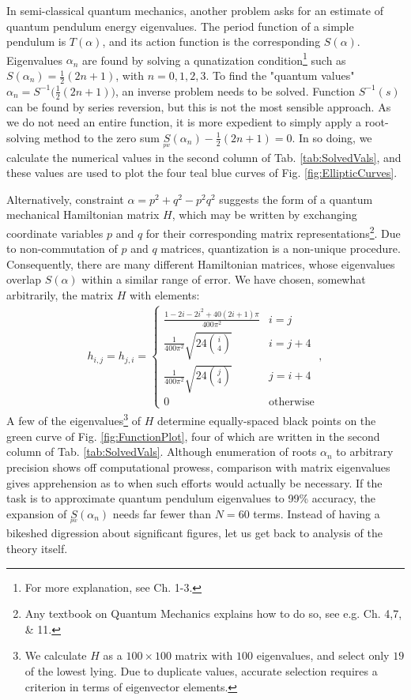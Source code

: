 \documentclass[nofootinbib,preprint]{revtex4-1}
\begin{document}
In semi-classical quantum mechanics, another problem asks for an estimate of 
quantum pendulum energy eigenvalues. The period function of a simple pendulum is $T(\alpha)$,
and its action function is the corresponding $S(\alpha)$. Eigenvalues $\alpha_n$ are 
found by solving a qunatization condition\footnote{For more explanation, 
see \cite{CHILD1991} Ch. 1-3.} 
such as ${S(\alpha_n)=\frac{1}{2}(2n+1)}$, with $n=0,1,2,3$. To find the 
"quantum values" ${\alpha_n = S^{-1}\big(\frac{1}{2}(2n+1)\big)}$, an 
inverse problem needs to be solved. Function $S^{-1}(s)$ can be found by 
series reversion, but this is not the most sensible approach. As we do not need 
an entire function, it is more expedient to simply apply a root-solving method 
to the zero sum $\underset{^{pw}}{S}(\alpha_n)-\frac{1}{2}(2n+1)=0$. 
In so doing, we calculate the numerical values  in the second column of 
Tab. \ref{tab:SolvedVals}, and these values are used to plot the four teal 
blue curves of Fig. \ref{fig:EllipticCurves}.

Alternatively, constraint $\alpha=p^2+q^2-p^2 q^2$ suggests the form 
of a quantum mechanical Hamiltonian matrix $H$, which may be written by exchanging 
coordinate variables $p$ and $q$ for their corresponding matrix 
representations\footnote{Any textbook on Quantum Mechanics explains how to do so, 
see e.g. \cite{GREINER1994} Ch. 4,7, \& 11.}. Due to non-commutation of $p$ and $q$ matrices, 
quantization is a non-unique procedure. Consequently, there are many different 
Hamiltonian matrices, whose eigenvalues overlap $S(\alpha)$ within a similar range 
of error. We have chosen, somewhat arbitrarily, the matrix $H$ with elements:
\begin{eqnarray}
h_{i,j}= h_{j,i}= \begin{cases} 
      \frac{1 - 2 i - 2 i^2 + 40 (2 i + 1) \pi}{ 400 \pi^2} & i=j \\
       \frac{1}{400\pi^2}\sqrt{24\binom{i}{4}} & i=j+4 \\
       \frac{1}{400\pi^2}\sqrt{24\binom{j}{4}} & j=i+4 \\
      0 & \text{otherwise} 
   \end{cases}, \nonumber
\end{eqnarray} 
A few of the eigenvalues\footnote{We calculate $H$ as a $100 \times 100$ matrix with $100$ eigenvalues, 
and select only $19$ of the lowest lying. Due to duplicate values, accurate selection requires a criterion 
in terms of eigenvector elements.} of $H$ determine equally-spaced black points on the green 
curve of Fig. \ref{fig:FunctionPlot}, four of which are written in the second column 
of Tab. \ref{tab:SolvedVals}. Although enumeration of roots $\alpha_n$ to arbitrary precision 
shows off computational prowess, comparison with matrix eigenvalues gives apprehension as to 
when such efforts would actually be necessary. If the task is to approximate quantum
pendulum eigenvalues to 99\% accuracy, the expansion of $\underset{^{pw}}{S}(\alpha_n)$
needs far fewer than $N=60$ terms. Instead of having a bikeshed digression about significant
figures, let us get back to analysis of the theory itself.
\end{document}
